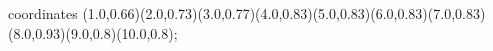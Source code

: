 					coordinates { (1.0,0.66)(2.0,0.73)(3.0,0.77)(4.0,0.83)(5.0,0.83)(6.0,0.83)(7.0,0.83)(8.0,0.93)(9.0,0.8)(10.0,0.8)};